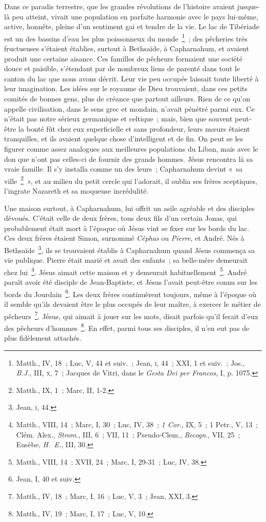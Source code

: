 \documentclass[french,twoside]{book} %
\newcommand\chaptercont{} %
\begin{document}
\chaptercont
\noindent Dans ce paradis terrestre, que les grandes révolutions de l’histoire avaient jusque-là peu atteint, vivait une population en parfaite harmonie avec le pays lui-même, active, honnête, pleine d’un sentiment gai et tendre de la vie. Le lac de Tibériade est un des bassins d’eau les plus poissonneux du monde \footnote{ Matth., IV, 18 ; Luc, V, 44 et suiv. ; Jean, \textsc{i}, 44 ; XXI, 1 et suiv. ; Jos., {\itshape B.J.}, III, \textsc{x}, 7 ; Jacques de Vitri, dans le {\itshape Gesta Dei per Francos}, I, p. 1075.} ; des pêcheries très fructueuses s’étaient établies, surtout à Bethsaïde, à Capharnahum, et avaient produit une certaine aisance. Ces familles de pêcheurs formaient une société douce et paisible, s’étendant par de nombreux liens de parenté dans tout le canton du lac que nous avons décrit. Leur vie peu occupée laissait toute liberté à leur imagination. Les idées sur le royaume de Dieu trouvaient, dans ces petits comités de bonnes gens, plus de créance que partout ailleurs. Rien de ce qu’on appelle civilisation, dans le sens grec et mondain, n’avait pénétré parmi eux. Ce n’était pas notre sérieux germanique et celtique ; mais, bien que souvent peut-être la bonté fût chez eux superficielle et sans profondeur, leurs mœurs étaient tranquilles, et ils avaient quelque chose d’intelligent et de fin. On peut se les figurer comme assez analogues aux meilleures populations du Liban, mais avec le don que n’ont pas celles-ci de fournir des grands hommes. Jésus rencontra là sa vraie famille. Il s’y installa comme un des leurs ; Capharnahum devint « sa ville \footnote{Matth., IX, 1 ; Marc, II, 1-2.} », et au milieu du petit cercle qui l’adorait, il oublia ses frères sceptiques, l’ingrate Nazareth et sa moqueuse incrédulité.\par
Une maison surtout, à Capharnahum, lui offrit un asile agréable et des disciples dévoués. C’était celle de deux frères, tous deux fils d’un certain Jonas, qui probablement était mort à l’époque où Jésus vint se fixer sur les bords du lac. Ces deux frères étaient Simon, surnommé {\itshape Céphas} ou {\itshape Pierre}, et André. Nés à Bethsaïde \footnote{ Jean, \textsc{i}, 44.}, ils se trouvaient établis à Capharnahum quand Jésus commença sa vie publique. Pierre était marié et avait des enfants ; sa belle-mère demeurait chez lui \footnote{ Matth., VIII, 14 ; Marc, I, 30 ; Luc, IV, 38 ; {\itshape 1 Cor}., IX, 5 ; 1 Petr., V, 13 ; Clém. Alex., {\itshape Strom}., III, 6 ; VII, 11 ; Pseudo-Clem., {\itshape Recogn}., VII, 25 ; Eusèbe, {\itshape H. E.}, III, 30.}. Jésus aimait cette maison et y demeurait habituellement \footnote{Matth., VIII, 14 ; XVII, 24 ; Marc, I, 29-31 ; Luc, IV, 38.}. André paraît avoir été disciple de Jean-Baptiste, et Jésus l’avait peut-être connu sur les bords du Jourdain \footnote{Jean, I, 40 et suiv.}. Les deux frères continuèrent toujours, même à l’époque où il semble qu’ils devaient être le plus occupés de leur maître, à exercer le métier de pêcheurs \footnote{Matth., IV, 18 ; Marc, I, 16 ; Luc, V, 3 ; Jean, XXI, 3.}. Jésus, qui aimait à jouer sur les mots, disait parfois qu’il ferait d’eux des pêcheurs d’hommes \footnote{Matth., IV, 19 ; Marc, I, 17 ; Luc, V, 10.}. En effet, parmi tous ses disciples, il n’en eut pas de plus fidèlement attachés.\par
\end{document}
